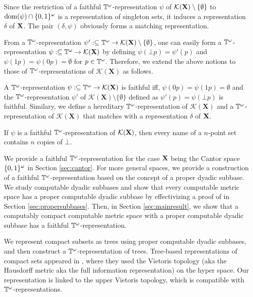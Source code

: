 \documentclass{eptcs-modified}
\begin{document}
Since the restriction of a faithful  $\mathbb{T}^\omega$-representation $\psi$ of $\mathcal{K}(\mathbf{X}) \setminus \{\emptyset\}$
to $\operatorname{dom}(\psi) \cap \{0,1\}^\omega $ is a representation of singleton sets,
it induces a representation $\delta$ of $\mathbf{X}$.
The pair $(\delta, \psi)$ obviously forms a matching representation.

From a $\mathbb{T}^\omega$-representation $\psi' :\subseteq \mathbb{T}^\omega \to \mathcal{K}(\mathbf{X})\setminus \{\emptyset\}$, one can easily form a $\mathbb{T}^\omega$-representation
$\psi :\subseteq \mathbb{T}^\omega \to \mathcal{K}(\mathbf{X})$ by defining $\psi(\bot p) = \psi'(p)$ and
$\psi(1 p) = \psi(0 p) = \emptyset$ for $p \in \mathbb{T}^\omega$.
Therefore, we extend the above notions to those of $\mathbb{T}^\omega$-representations of $\mathcal{K}(\mathbf{X})$ as follows.
\begin{definition}\label{def:match2}
A $\mathbb{T}^\omega$-representation $\psi :\subseteq \mathbb{T}^\omega \to \mathcal{K}(\mathbf{X})$  is faithful
iff,  $\psi(0p) = \psi(1p) = \emptyset$ and the $\mathbb{T}^\omega$-representation $\psi'$ of
$\mathcal{K}(\mathbf{X}) \setminus \{\emptyset\}$ defined as $\psi'(p) =\psi(\bot p)$ is
faithful.  Similary, we define a hereditary $\mathbb{T}^\omega$-representation of $\mathcal{K}(\mathbf{X})$
and a $\mathbb{T}^\omega$-representation of $\mathcal{K}(\mathbf{X})$ that
matches with a representation $\delta$ of $\mathbf{X}$.
\end{definition}
If $\psi$ is a faithful $\mathbb{T}^\omega$-representation of $\mathcal{K}(\mathbf{X})$, then
every name of a $n$-point set contains $n$ copies of $\bot$.

We provide a faithful $\mathbb{T}^\omega$-representation for the case $\mathbf{X}$ being the Cantor space ${\{0,1\}^\omega}$ in Section \ref{sec:cantor}.
For more general spaces,
we  provide a construction of a faithful $\mathbb{T}^\omega$-representation
based on the concept of a proper dyadic subbase.
We study computable dyadic subbases
and  show that every computable metric space has a proper computable dyadic subbase by effectivizing a proof of  \cite{tsukamoto} in Section
\ref{sec:propersubbases}.
Then, in Section \ref{sec:mainresult},
we show that a computably compact computable metric space with a proper computable dyadic subbase has a faithful $\mathbb{T}^\omega$-representation.




  We represent compact subsets as trees using proper computable dyadic subbases,
and then construct a $\mathbb{T}^\omega$-representation of trees.
  Tree-based representations of compact sets appeared in \cite{berger}, where they used the Vietoris topology (aka the Hausdorff metric aka the full information representation) on the hyper space.  Our representation is linked to the upper Vietoris topology, which is compatible with $\mathbb{T}^\omega$-representations.
\end{document}
